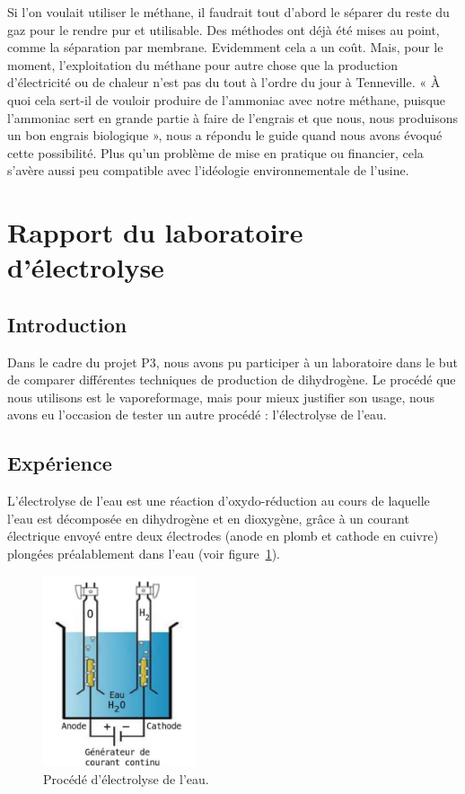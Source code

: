 Si l'on voulait utiliser le méthane, il faudrait tout d'abord le séparer du reste du gaz pour le rendre pur et utilisable. Des méthodes ont déjà été mises au point, comme la séparation par membrane. Evidemment cela a un coût.
Mais, pour le moment, l'exploitation du méthane pour autre chose que la production d'électricité ou de chaleur n'est pas du tout à l'ordre du jour à Tenneville. « À quoi cela sert-il de vouloir produire de l'ammoniac avec notre méthane, puisque l'ammoniac sert en grande partie à faire de l'engrais et que nous, nous produisons un bon engrais biologique », nous a répondu le guide quand nous avons évoqué cette possibilité. Plus qu'un problème de mise en pratique ou financier, cela s'avère aussi peu compatible avec l'idéologie environnementale de l'usine.

\section{Rapport du laboratoire d'électrolyse}
\subsection{Introduction}
Dans le cadre du projet P3, nous avons pu participer à un laboratoire dans le but de comparer différentes techniques de production de dihydrogène. Le procédé que nous utilisons est le vaporeformage, mais pour mieux justifier son usage, nous avons eu l'occasion de tester un autre procédé : l'électrolyse de l'eau.

\subsection{Expérience}
L'électrolyse de l'eau est une réaction d'oxydo-réduction au cours de laquelle l'eau est décomposée en dihydrogène et en dioxygène, grâce à un courant électrique envoyé entre deux électrodes (anode en plomb et cathode en cuivre) plongées préalablement dans l'eau (voir figure~\ref{fig:electrolyse}).
\begin{figure}
\centering 
\includegraphics[width=0.4\textwidth]{img/p1}  
\caption{Procédé d'électrolyse de l'eau. \cite{energie-renou}} 
\label{fig:electrolyse}
\end{figure}

